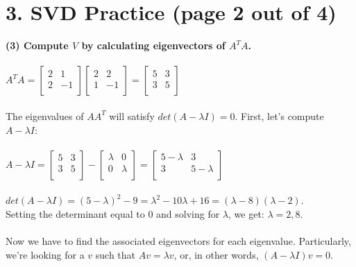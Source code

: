 \documentclass[11pt]{article}
\begin{document}
\newpage

\section*{3. SVD Practice (page 2 out of 4)}
\textbf{(3) Compute $V$ by calculating eigenvectors of $A^TA$.}
\\\\
$A^T A= \begin{bmatrix}
2 & 1 \\
2 & -1 \\
\end{bmatrix} \begin{bmatrix}
2 & 2 \\
1 & -1 \\
\end{bmatrix} = \begin{bmatrix}
5 & 3 \\
3 & 5 \\
\end{bmatrix} $ \\\\
The eigenvalues of $AA^T$ will satisfy $det(A - \lambda I ) = 0$. First, let's compute $A - \lambda I$: \\\\
$ A - \lambda I = \begin{bmatrix}
5 & 3 \\
3 & 5 \\
\end{bmatrix} - \begin{bmatrix}
\lambda & 0 \\
0 & \lambda \\
\end{bmatrix} = \begin{bmatrix}
5 - \lambda & 3 \\
3 & 5 - \lambda \\
\end{bmatrix}$ \\\\
$det(A - \lambda I) = (5 - \lambda)^2 - 9 = \lambda^2 - 10\lambda + 16 = (\lambda - 8)(\lambda - 2)$. \\
Setting the determinant equal to 0 and solving for $\lambda$, we get: $\lambda = 2, 8.$ \\\\
Now we have to find the associated eigenvectors for each eigenvalue. Particularly, we're looking for a $v$ such that $Av = \lambda v$, or, in other words, $(A - \lambda I)v = 0$. \\\\
\end{document}
